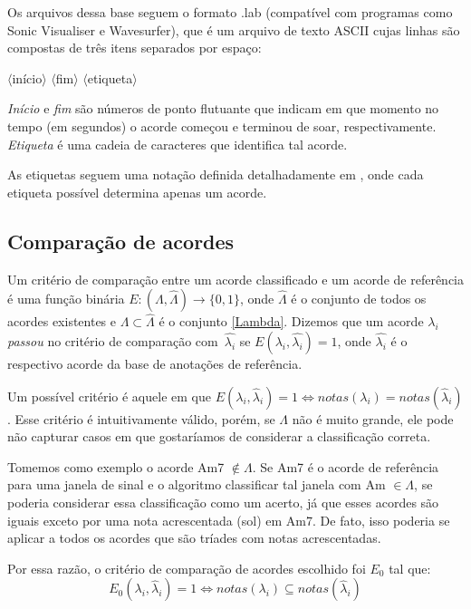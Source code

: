         Os arquivos dessa base seguem o formato .lab (compatível com programas como Sonic Visualiser e Wavesurfer), que é um arquivo de texto ASCII cujas linhas são compostas de três itens separados por espaço:
        
        \begin{center}
            $\langle$início$\rangle$
            $\langle$fim$\rangle$
            $\langle$etiqueta$\rangle$
        \end{center}
        
        \textit{Início} e \textit{fim} são números de ponto flutuante que indicam em que momento no tempo (em segundos) o acorde começou e terminou de soar, respectivamente. \textit{Etiqueta} é uma cadeia de caracteres que identifica tal acorde.
        
        As etiquetas seguem uma notação definida detalhadamente em \cite{harte}, onde cada etiqueta possível determina apenas um acorde.


    \subsection{Comparação de acordes}
        Um critério de comparação entre um acorde classificado e um acorde de referência é uma função binária $E: (\Lambda, \hat{\Lambda}) \rightarrow \{0, 1\}$, onde $\hat{\Lambda}$ é o conjunto de todos os acordes existentes e $\Lambda \subset \hat{\Lambda}$ é o conjunto \ref{Lambda}. Dizemos que um acorde $\lambda_i$ \textit{passou} no critério de comparação com~$\hat{\lambda_i}$ se $E(\lambda_i, \hat{\lambda_i}) = 1$, onde $\hat{\lambda_i}$ é o respectivo acorde da base de anotações de referência.
        
        Um possível critério é aquele em que $E(\lambda_i, \hat{\lambda}_i) = 1 \Leftrightarrow notas(\lambda_i) = notas(\hat{\lambda}_i)$. Esse critério é intuitivamente válido, porém, se $\Lambda$ não é muito grande, ele pode não capturar casos em que gostaríamos de considerar a classificação correta.
        
        Tomemos como exemplo o acorde Am7 $\notin \Lambda$. Se Am7 é o acorde de referência para uma janela de sinal e o algoritmo classificar tal janela com Am $\in \Lambda$, se poderia considerar essa classificação como um acerto, já que esses acordes são iguais exceto por uma nota acrescentada (sol) em Am7. De fato, isso poderia se aplicar a todos os acordes que são tríades com notas acrescentadas.
        
        Por essa razão, o critério de comparação de acordes escolhido foi $E_0$ tal que:
        \[
            E_0(\lambda_i, \hat{\lambda}_i) = 1 \Leftrightarrow notas(\lambda_i) \subseteq notas(\hat{\lambda}_i)
        \]
        
